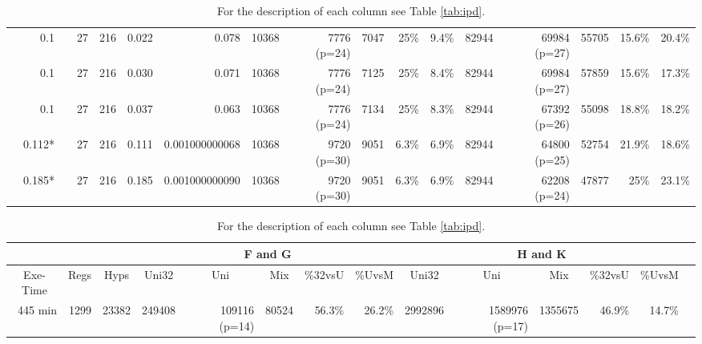 \begin{landscape}
\begin{table}[p]
\begin{tabular}{|l|rrrrrrrrrrrrrrrr|}
		& 0.1 & \color{red}{0.0006} & 27 & 216 & 0.022 & 0.078 & 10368 & 7776 (p=24) & 7047 & 25\% & 9.4\% & 82944 & 69984 (p=27) & 55705 & 15.6\% & 20.4\% \\
		
		& 0.1 & \color{red}{0.0008} & 27 & 216 & 0.030 & 0.071 & 10368 & 7776 (p=24) & 7125 & 25\% & 8.4\% & 82944 & 69984 (p=27) & 57859 & 15.6\% & 17.3\% \\
		
		& 0.1 & \color{red}{0.0010} & 27 & 216 & 0.037 & 0.063 & 10368 & 7776 (p=24) & 7134 & 25\% & 8.3\% & 82944 & 67392 (p=26) & 55098 & 18.8\% & 18.2\% \\
		
		& 0.112* & \color{red}{0.0030} & 27 & 216 & 0.111 & 0.001000000068 & 10368 &  9720 (p=30) & 9051 & 6.3\% & 6.9\% & 82944 & 64800 (p=25) & 52754 & 21.9\% & 18.6\% \\
		
		& 0.185* &\color{red}{0.0050} & 27 & 216 & 0.185 & 0.001000000090 & 10368 & 9720 (p=30) & 9051 & 6.3\% & 6.9\% & 82944 & 62208 (p=24) & 47877 & 25\%& 23.1\% \\
		\cline{1-17}
	\end{tabular}
	\vspace*{1 cm}
	\centering
	\caption{For the description of each column see Table \ref{tab:ipd}.}
	\label{tab:di}
	\begin{tabular}{rrrrrrrrrrrrrr}
		\cline{4-8}
		\cline{8-13}
		\multicolumn{3}{c}{} &
		\multicolumn{5}{c|}{F and G} &
		\multicolumn{5}{c}{H and K} \\
		\hline
		\multicolumn{1}{c}{Exe-Time}&
		\multicolumn{1}{c}{Regs} &
		\multicolumn{1}{c}{Hyps} &
		\multicolumn{1}{c}{Uni32}&
		\multicolumn{1}{c}{Uni}&
		\multicolumn{1}{c}{Mix}&
		\multicolumn{1}{c}{\%32vsU}&
		\multicolumn{1}{c}{\%UvsM}&
		\multicolumn{1}{c}{Uni32}&
		\multicolumn{1}{c}{Uni}&
		\multicolumn{1}{c}{Mix}&
		\multicolumn{1}{c}{\%32vsU}&
		\multicolumn{1}{c}{\%UvsM} \\
		\hline
		445 min
		&1299 & 23382 & 249408 & 109116 (p=14) & 80524 & 56.3\% & 26.2\% & 2992896 & 1589976 (p=17) & 1355675 & 46.9\% & 14.7\% \\
	\end{tabular}
\end{table}
\end{landscape}
